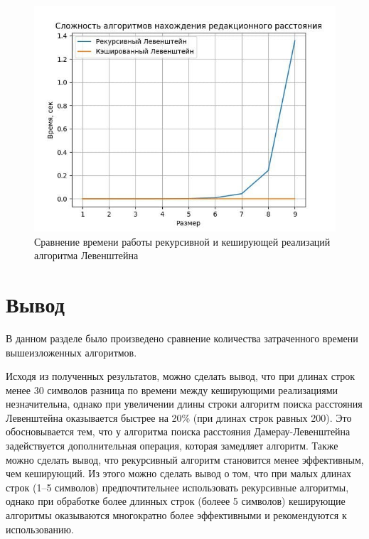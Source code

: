 \begin{figure}[H]
	\centering
	\includegraphics[scale = 0.7]{assets/levGraph.jpg}
	\caption{Сравнение времени работы рекурсивной и кеширующей реализаций алгоритма Левенштейна}
	\label{fig:plot_sorted}
\end{figure}

\section{Вывод}

В данном разделе было произведено сравнение количества затраченного времени вышеизложенных алгоритмов.

Исходя из полученных результатов, можно сделать вывод, что при длинах строк менее 30 символов разница по времени между кеширующими реализациями незначительна, однако при увеличении длины строки алгоритм поиска расстояния Левенштейна оказывается быстрее на 20\% (при длинах строк равных 200).
Это обосновывается тем, что у алгоритма поиска расстояния Дамерау-Левенштейна задействуется дополнительная операция, которая замедляет алгоритм. Также можно сделать вывод, что рекурсивный алгоритм становится менее эффективным, чем кеширующий.
Из этого можно сделать вывод о том, что при малых длинах строк (1–5 символов) предпочтительнее использовать рекурсивные алгоритмы, однако при обработке более длинных
строк (болеее 5 символов) кеширующие алгоритмы оказываются многократно более эффективными и рекомендуются к использованию.